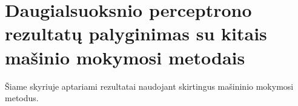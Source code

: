 \section{Daugialsuoksnio perceptrono rezultatų palyginimas su kitais mašinio mokymosi metodais}
\label{sec:daugiasluoksnio_perceptrono_palyginimas_su_kitais_metodais}

Šiame skyriuje aptariami rezultatai naudojant skirtingus mašininio mokymosi metodus.

